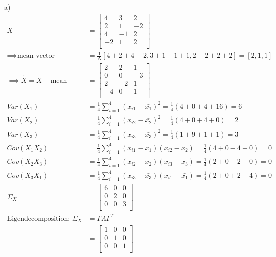 \begin{flushleft}
a)
\begin{align*}
X &=
\begin{bmatrix}
4 & 3 & 2 \\
2 & 1 & -2 \\
4 & -1 & 2 \\
-2 & 1 & 2 \\
\end{bmatrix}
\\
\implies \text{mean vector} &= \frac{1}{N}
[4 + 2 + 4 - 2, 3 + 1 - 1 + 1, 2 - 2 + 2 + 2] = [2, 1, 1]\\
\implies \widetilde{X} = X - \text{mean} &=
\begin{bmatrix}
2 & 2 & 1 \\
0 & 0 & -3 \\
2 & -2 & 1 \\
-4 & 0 & 1 \\
\end{bmatrix}
\\
Var(X_{1}) &= \frac{1}{4} \sum_{i=1}^{4}(x_{i1} - 
\bar{x_{1}})^2 = \frac{1}{4}(4 + 0 + 4 + 16) = 6
\\
Var(X_{2}) &= \frac{1}{4} \sum_{i=1}^{4}(x_{i2} - 
\bar{x_{2}})^2 = \frac{1}{4}(4 + 0 + 4 + 0) = 2
\\
Var(X_{3}) &= \frac{1}{4} \sum_{i=1}^{4}(x_{i3} - 
\bar{x_{3}})^2 = \frac{1}{4}(1 + 9 + 1 + 1) = 3
\\
Cov(X_{1}X_{2}) &= \frac{1}{4} \sum_{i=1}^{4}(x_{i1} - \bar{x_{1}}) 
(x_{i2} - \bar{x_{2}}) = \frac{1}{4} ( 4 + 0 - 4 + 0) = 0
\\
Cov(X_{2}X_{3}) &= \frac{1}{4} \sum_{i=1}^{4}(x_{i2} - \bar{x_{2}}) 
(x_{i3} - \bar{x_{3}}) = \frac{1}{4} ( 2 + 0 - 2 + 0) = 0
\\
Cov(X_{3}X_{1}) &= \frac{1}{4} \sum_{i=1}^{4}(x_{i3} - \bar{x_{3}}) 
(x_{i1} - \bar{x_{1}}) = \frac{1}{4} ( 2 + 0 + 2 - 4) = 0
\\
\Sigma_{X} &= 
\begin{bmatrix}
6 & 0 & 0 \\
0 & 2 & 0 \\
0 & 0 & 3 \\
\end{bmatrix}
\\
\text{Eigendecomposition: }
\Sigma_{X} &= \Gamma \Lambda \Gamma^{T}
\\
&= 
\begin{bmatrix}
1 & 0 & 0 \\
0 & 1 & 0 \\
0 & 0 & 1 \\

\end{bmatrix}
\end{align*}
\end{flushleft}
